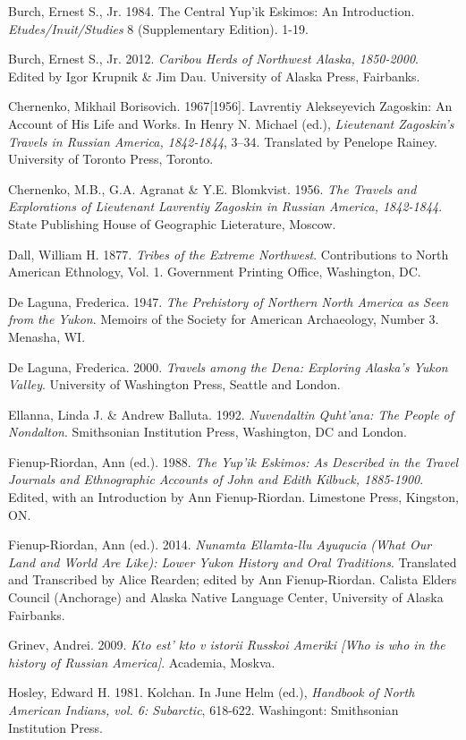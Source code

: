 \begin{hang}
Burch, Ernest S., Jr. 1984. The Central Yup’ik Eskimos: An Introduction. \textit{Etudes/Inuit/Studies} 8 (Supplementary Edition). 1-19.

Burch, Ernest S., Jr. 2012. \textit{Caribou Herds of Northwest Alaska, 1850-2000}. Edited by Igor Krupnik \& Jim Dau. University of Alaska Press, Fairbanks.

Chernenko, Mikhail Borisovich. 1967[1956]. Lavrentiy Alekseyevich Zagoskin: An Account of His Life and Works.  In Henry N. Michael (ed.), \textit{Lieutenant Zagoskin’s Travels in Russian America, 1842-1844}, 3--34. Translated by Penelope Rainey.  University of Toronto Press, Toronto.

Chernenko, M.B., G.A. Agranat \& Y.E. Blomkvist. 1956. \textit{The Travels and Explorations of Lieutenant Lavrentiy Zagoskin in Russian America, 1842-1844}. State Publishing House of Geographic Lieterature, Moscow.

Dall, William H. 1877. \textit{Tribes of the Extreme Northwest}. Contributions to North American Ethnology, Vol. 1. Government Printing Office, Washington, DC.

De Laguna, Frederica. 1947. \textit{The Prehistory of Northern North America as Seen from the Yukon}. Memoirs of the Society for American Archaeology, Number 3. Menasha, WI.

De Laguna, Frederica. 2000. \textit{Travels among the Dena: Exploring Alaska’s Yukon Valley}. University of Washington Press, Seattle and London.

Ellanna, Linda J. \& Andrew Balluta. 1992. \textit{Nuvendaltin Quht’ana: The People of Nondalton}. Smithsonian Institution Press, Washington, DC and London.

Fienup-Riordan, Ann (ed.). 1988. \textit{The Yup’ik Eskimos: As Described in the Travel Journals and Ethnographic Accounts of John and Edith Kilbuck, 1885-1900}. Edited, with an Introduction by Ann Fienup-Riordan. Limestone Press, Kingston, ON.

Fienup-Riordan, Ann (ed.). 2014. \textit{Nunamta Ellamta-llu Ayuqucia (What Our Land and World Are Like): Lower Yukon History and Oral Traditions}. Translated and Transcribed by Alice Rearden; edited by Ann Fienup-Riordan. Calista Elders Council (Anchorage) and Alaska Native Language Center, University of Alaska Fairbanks.

Grinev, Andrei. 2009. \textit{Kto est’ kto v istorii Russkoi Ameriki [Who is who in the history of Russian America]}. Academia, Moskva.

Hosley, Edward H. 1981. Kolchan. In June Helm (ed.), \textit{Handbook of North American Indians, vol. 6: Subarctic}, 618-622. Washingont: Smithsonian Institution Press.


\end{hang}
